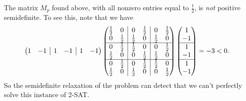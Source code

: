 \documentclass[letterpaper,11pt]{article}
\begin{document}
\begin{ex}
The matrix $M_p$ found above, with all nonzero entries equal to $\frac{1}{2}$, is \emph{not} positive semidefinite. To see this, note that we have
\[
\begin{pmatrix}1 & -1 & \rvline & 1 & -1 & \rvline & 1 & -1\end{pmatrix}
\begin{pmatrix}\begin{matrix} \tfrac{1}{2} & 0\\ 0 & \tfrac{1}{2}\end{matrix} & \rvline & \begin{matrix} 0 & \tfrac{1}{2}\\ \tfrac{1}{2} & 0\end{matrix} & \rvline & \begin{matrix} 0 & \tfrac{1}{2}\\ \tfrac{1}{2} & 0\end{matrix}\\
\hline \begin{matrix} 0 & \tfrac{1}{2}\\ \tfrac{1}{2} & 0\end{matrix} & \rvline & \begin{matrix} \tfrac{1}{2} & 0\\ 0 & \tfrac{1}{2}\end{matrix} & \rvline & \begin{matrix} 0 & \tfrac{1}{2}\\ \tfrac{1}{2} & 0\end{matrix}\\
\hline \begin{matrix} 0 & \tfrac{1}{2}\\ \tfrac{1}{2} & 0\end{matrix} & \rvline & \begin{matrix} 0 & \tfrac{1}{2}\\ \tfrac{1}{2} & 0\end{matrix} & \rvline & \begin{matrix} \tfrac{1}{2} & 0\\ 0 & \tfrac{1}{2}\end{matrix}\end{pmatrix}
\begin{pmatrix} 1\\ -1\\ \hline 1\\ -1\\ \hline 1\\ -1\end{pmatrix} = -3 < 0.
\]
So the semidefinite relaxation of the problem can detect that we can't perfectly solve this instance of 2-SAT.


\end{ex}
\end{document}

